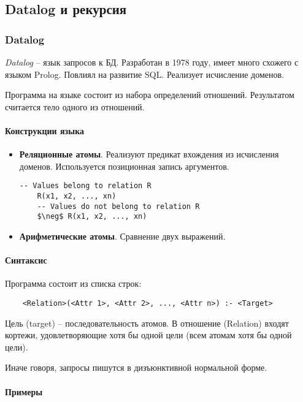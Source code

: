 \subsection{Datalog и рекурсия}

\subsubsection{Datalog}

\textit{Datalog} -- язык запросов к БД. Разработан в 1978 году, имеет много схожего с языком
Prolog. Повлиял на развитие SQL. Реализует исчисление доменов.

Программа на языке состоит из набора определений отношений. Результатом считается тело одного из
отношений.

\paragraph{Конструкции языка}

\begin{itemize}
	\item \textbf{Реляционные атомы}. Реализуют предикат вхождения из исчисления доменов.
	      Используется позиционная запись аргументов.
	      \begin{lstlisting}[mathescape=true]
    -- Values belong to relation R
    R(x1, x2, ..., xn)
    -- Values do not belong to relation R
    $\neg$ R(x1, x2, ..., xn)
        \end{lstlisting}
	\item \textbf{Арифметические атомы}. Сравнение двух выражений.
\end{itemize}

\paragraph{Синтаксис}

Программа состоит из списка строк:

\begin{lstlisting}
    <Relation>(<Attr 1>, <Attr 2>, ..., <Attr n>) :- <Target>
\end{lstlisting}

Цель (target) -- последовательность атомов. В отношение (Relation) входят кортежи, удовлетворяющие
хотя бы одной цели (всем атомам хотя бы одной цели).

Иначе говоря, запросы пишутся в дизъюнктивной нормальной форме.

\paragraph{Примеры}

